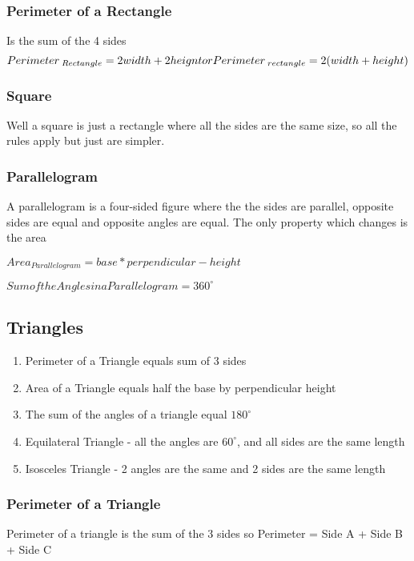 \documentclass{article}
\begin{document}
\subsubsection{Perimeter of a Rectangle}
Is the sum of the 4 sides
\begin{equation}
Perimeter_{\;Rectangle} =  2 width + 2 heignt \\
or \\
Perimeter_{\;rectangle} = 2 ( width + height )
\end{equation}

\subsubsection{Square}
Well a square is just a rectangle where all the sides are the same size, so all the rules apply but just are simpler.

\subsubsection{Parallelogram}
A parallelogram is a four-sided figure where the the sides are parallel, opposite sides are equal and opposite angles are equal.
The only property which changes is the area

$Area_{Parallelogram} = base * perpendicular-height$

$Sum of the Angles in a Parallelogram  = 360^{\circ}$


\newpage
\subsection{Triangles}
\begin{enumerate}
\item Perimeter of a Triangle equals sum of 3 sides
\item Area of a Triangle equals half the base by perpendicular height
\item The sum of the angles of a triangle equal $180^{\circ}$
\item Equilateral Triangle - all the angles are $60^{\circ}$, and all sides are the same length
\item Isosceles Triangle - 2 angles are the same and 2 sides are the same length
\end{enumerate}
\subsubsection{Perimeter of a Triangle}
Perimeter of a triangle is the sum of the 3 sides so
Perimeter = Side A + Side B + Side C
\end{document}
